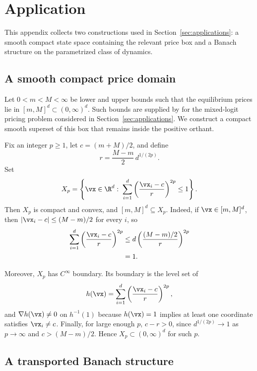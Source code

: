 \section{Application}\label{appendix:application}

This appendix collects two constructions used in Section~\ref{sec:applications}: a smooth compact state space containing the relevant price box and a Banach structure on the parametrized class of dynamics.

\subsection{A smooth compact price domain}\label{appendix:application-smooth-domain}

Let $0<m<M<\infty$ be lower and upper bounds such that the equilibrium prices lie in $[m,M]^d\subset(0,\infty)^d$. Such bounds are supplied by \citet{skerlos2010fixed} for the mixed-logit pricing problem considered in Section~\ref{sec:applications}. We construct a compact smooth superset of this box that remains inside the positive orthant.

Fix an integer $p\ge 1$, let $c=(m+M)/2$, and define
\[
r=\frac{M-m}{2}\,d^{1/(2p)}.
\]
Set
\[
X_p=\left\{\vx\in\R^d:\;\sum_{i=1}^d \left(\frac{\vx_i-c}{r}\right)^{2p}\le 1\right\}.
\]
Then $X_p$ is compact and convex, and $[m,M]^d\subseteq X_p$. Indeed, if $\vx\in[m,M]^d$, then $|\vx_i-c|\le (M-m)/2$ for every $i$, so
\[
\begin{aligned}
\sum_{i=1}^d \left(\frac{\vx_i-c}{r}\right)^{2p}
&\le d\left(\frac{(M-m)/2}{r}\right)^{2p}\\
&=1.
\end{aligned}
\]

Moreover, $X_p$ has $C^\infty$ boundary. Its boundary is the level set of
\[
h(\vx)=\sum_{i=1}^d \left(\frac{\vx_i-c}{r}\right)^{2p},
\]
and $\nabla h(\vx)\ne 0$ on $h^{-1}(1)$ because $h(\vx)=1$ implies at least one coordinate satisfies $\vx_i\ne c$. Finally, for large enough $p$, $c-r>0$, since $d^{1/(2p)}\to 1$ as $p\to\infty$ and $c>(M-m)/2$. Hence $X_p\subset(0,\infty)^d$ for such $p$.

\subsection{A transported Banach structure}\label{appendix:application-banach}

